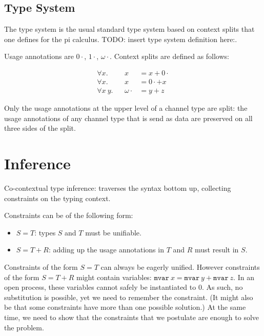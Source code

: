 \documentclass[sigplan,screen,review]{acmart}
\begin{document}
\hypertarget{type-system}{%
\subsection{Type System}\label{type-system}}

The type system is the usual standard type system based on context
splits that one defines for the pi calculus. TODO: insert type system
definition here:.

Usage annotations are \(0\cdot\), \(1\cdot\), \(\omega\cdot\). Context
splits are defined as follows:

\[
\begin{aligned}
\forall x.    && x           &= x + 0\cdot \\
\forall x.    && x           &= 0\cdot + x \\
\forall x ~y. && \omega\cdot &= y + z
\end{aligned}
\]

Only the usage annotations at the upper level of a channel type are
split: the usage annotations of any channel type that is send as data
are preserved on all three sides of the split.

\hypertarget{inference}{%
\section{Inference}\label{inference}}

Co-contextual type inference: traverses the syntax bottom up, collecting
constraints on the typing context.

Constraints can be of the following form:

\begin{itemize}
\item
  \(S = T\): types \(S\) and \(T\) must be unifiable.
\item
  \(S = T + R\): adding up the usage annotations in \(T\) and \(R\) must
  result in \(S\).
\end{itemize}

Constraints of the form \(S = T\) can always be eagerly unified. However
constraints of the form \(S = T + R\) might contain variables:
\(\texttt{mvar}~x = \texttt{mvar}~y + \texttt{mvar}~z\). In an open
process, these variables cannot safely be instantiated to \(0\). As
such, no substitution is possible, yet we need to remember the
constraint. (It might also be that some constraints have more than one
possible solution.) At the same time, we need to show that the
constraints that we postulate are enough to solve the problem.
\end{document}
